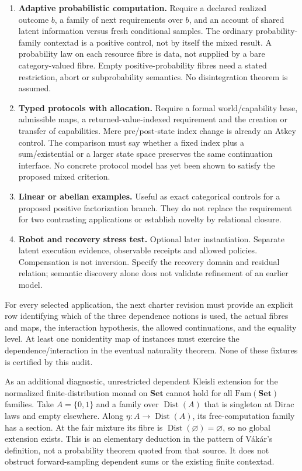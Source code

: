 \documentclass[11pt,a4paper]{article}
\newcommand{\Set}{\mathbf{Set}}
\newcommand{\Dist}{\operatorname{Dist}}
\begin{document}
\begin{enumerate}
\item \textbf{Adaptive probabilistic computation.} Require a declared realized
outcome \(b\), a family of next requirements over \(b\), and an account of shared
latent information versus fresh conditional samples. The ordinary probability-family
contextad is a positive control, not by itself the mixed result. A probability
law on each resource fibre is data, not supplied by a bare category-valued fibre.
Empty positive-probability fibres need a stated restriction, abort or subprobability
semantics. No disintegration theorem is assumed.
\item \textbf{Typed protocols with allocation.} Require a formal world/capability
base, admissible maps, a returned-value-indexed requirement and the creation or
transfer of capabilities. Mere pre/post-state index change is already an Atkey
control. The comparison must say whether a fixed index plus a sum/existential or
a larger state space preserves the same continuation interface. No concrete
protocol model has yet been shown to satisfy the proposed mixed criterion.
\item \textbf{Linear or abelian examples.} Useful as exact categorical controls
for a proposed positive factorization branch. They do not replace the requirement
for two contrasting applications or establish novelty by relational closure.
\item \textbf{Robot and recovery stress test.} Optional later instantiation.
Separate latent execution evidence, observable receipts and allowed policies.
Compensation is not inversion. Specify the recovery domain and residual relation;
semantic discovery alone does not validate refinement of an earlier model.
\end{enumerate}

For every selected application, the next charter revision must provide an
explicit row identifying which of the three dependence notions is used, the
actual fibres and maps, the interaction hypothesis, the allowed continuations,
and the equality level. At least one nonidentity map of instances must exercise
the dependence/interaction in the eventual naturality theorem. None of these
fixtures is certified by this audit.

As an additional diagnostic, unrestricted dependent Kleisli extension for the
normalized finite-distribution monad on \(\Set\) cannot hold for all
\(\mathrm{Fam}(\Set)\) families. Take \(A=\{0,1\}\) and a family over
\(\Dist(A)\) that is singleton at Dirac laws and empty elsewhere. Along
\(\eta:A\to\Dist(A)\), its free-computation family has a section. At the fair
mixture its fibre is \(\Dist(\varnothing)=\varnothing\), so no global extension
exists. This is an elementary deduction in the pattern of V\'ak\'ar's definition,
not a probability theorem quoted from that source. It does not obstruct
forward-sampling dependent sums or the existing finite contextad.
\end{document}
